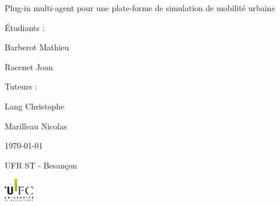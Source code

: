 \begin{titlepage}

\vspace*{1.5cm}

\Huge
\begin{center}
Plug-in multi-agent pour une plate-forme de simulation de mobilité urbaine
\end{center}

\vspace{2cm}



\Large
\begin{flushleft}
\item Étudiants : 
\item Barberot Mathieu
\item Racenet Joan
\end{flushleft}

\begin{flushleft}
\item Tuteurs : 
\item Lang Christophe
\item Marilleau Nicolas
\end{flushleft}

\vspace{2cm}

\begin{center}
\item \today
\item UFR ST - Besançon
\item \includegraphics[height=1cm]{images/logo-ufc.png}
\end{center}

\end{titlepage}
